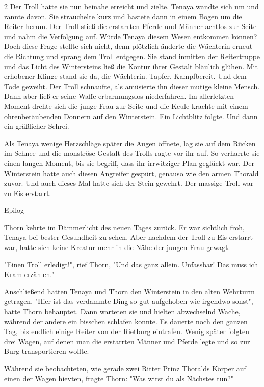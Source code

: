 \documentclass[10pt, a4paper, oneside]{book}
\begin{document}
\begin{multicols}{2}
Der Troll hatte sie nun beinahe erreicht und zielte. Tenaya wandte sich um und rannte davon. Sie strauchelte kurz und hastete dann in einem Bogen um die Reiter herum. Der Troll stieß die erstarrten Pferde und Männer achtlos zur Seite und nahm die Verfolgung auf. Würde Tenaya diesem Wesen entkommen können? Doch diese Frage stellte sich nicht, denn plötzlich änderte die Wächterin erneut die Richtung und sprang dem Troll entgegen. Sie stand inmitten der Reitertruppe und das Licht des Wintersteins ließ die Kontur ihrer Gestalt bläulich glühen. Mit erhobener Klinge stand sie da, die Wächterin. Tapfer. Kampfbereit. Und dem Tode geweiht. Der Troll schnaufte, als amüsierte ihn dieser mutige kleine Mensch. Dann aber ließ er seine Waffe erbarmungslos niederfahren. Im allerletzten Moment drehte sich die junge Frau zur Seite und die Keule krachte mit einem ohrenbetäubenden Donnern auf den Winterstein. Ein Lichtblitz folgte. Und dann ein gräßlicher Schrei. 

Als Tenaya wenige Herzschläge später die Augen öffnete, lag sie auf dem Rücken im Schnee und die monströse Gestalt des Trolls ragte vor ihr auf. So verharrte sie einen langen Moment, bis sie begriff, dass ihr irrwitziger Plan geglückt war. Der Winterstein hatte auch diesen Angreifer gespürt, genauso wie den armen Thorald zuvor. Und auch dieses Mal hatte sich der Stein gewehrt. Der massige Troll war zu Eis erstarrt.\bigskip

Epilog

Thorn kehrte im Dämmerlicht des neuen Tages zurück. Er war sichtlich froh, Tenaya bei bester Gesundheit zu sehen. Aber nachdem der Troll zu Eis erstarrt war, hatte sich keine Kreatur mehr in die Nähe der jungen Frau gewagt. 

"Einen Troll erledigt!", rief Thorn, "Und das ganz allein. Unfassbar! Das muss ich Kram erzählen."

Anschließend hatten Tenaya und Thorn den Winterstein in den alten Wehrturm getragen. "Hier ist das verdammte Ding so gut aufgehoben wie irgendwo sonst", hatte Thorn behauptet. Dann warteten sie und hielten abwechselnd Wache, während der andere ein bisschen schlafen konnte. Es dauerte noch den ganzen Tag, bis endlich einige Reiter von der Rietburg eintrafen. Wenig später folgten drei Wagen, auf denen man die erstarrten Männer und Pferde legte und so zur Burg transportieren wollte. 

Während sie beobachteten, wie gerade zwei Ritter Prinz Thoralds Körper auf einen der Wagen hievten, fragte Thorn: "Was wirst du als Nächstes tun?"


\end{multicols}
\end{document}
